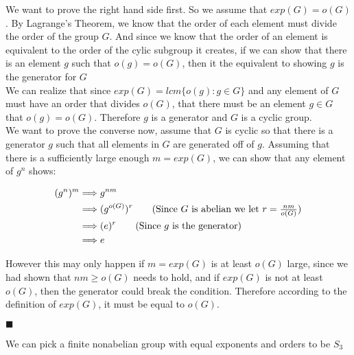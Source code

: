 \documentclass[20pt]{article}
\begin{document}
\begin{text}
    We want to prove the right hand side first. So we assume that $exp(G) = o(G)$. By Lagrange's Theorem, we know that the order of each element must divide the order of the group $G$. And since we know that the order of an element is equivalent to the order of the cylic subgroup it creates, if we can show that there is an element $g$ such that $o(g) = o(G)$, then it the equivalent to showing $g$ is the generator for $G$\\
    
    We can realize that since $exp(G) = lcm\{o(g) : g \in G\}$ and any element of $G$ must have an order that divides $o(G)$, that there must be an element $g \in G$ that $o(g) = o(G)$. Therefore $g$ is a generator and $G$ is a cyclic group.\\
    
    We want to prove the converse now, assume that $G$ is cyclic so that there is a generator $g$ such that all elements in $G$ are generated off of $g$. Assuming that there is a sufficiently large enough $m = exp(G)$, we can show that any element of $g^n$ shows:
    
    \begin{align}
        (g^{n})^{m} &\Longrightarrow g^{nm}\nonumber\\
        &\Longrightarrow (g^{o(G)})^{r}\tag{Since $G$ is abelian we let $r = \frac{nm}{o(G)}$}\nonumber\\
        &\Longrightarrow (e)^r\tag{Since $g$ is the generator}\nonumber\\
        &\Longrightarrow e\nonumber
    \end{align}
    
    However this may only happen if $m = exp(G)$ is at least $o(G)$ large, since we had shown that $nm \geq o(G)$ needs to hold, and if $exp(G)$ is not at least $o(G)$, then the generator could break the condition. Therefore according to the definition of $exp(G)$, it must be equal to $o(G)$.
    
    \hfill $\blacksquare$
    
    We can pick a finite nonabelian group with equal exponents and orders to be $S_3$
\end{text}\\
\end{document}
